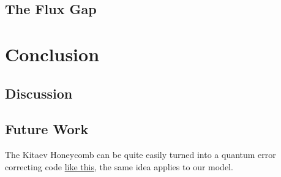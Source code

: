 \hypertarget{the-flux-gap}{%
\subsection{The Flux Gap}\label{the-flux-gap}}

\hypertarget{conclusion}{%
\section{Conclusion}\label{conclusion}}

\hypertarget{discussion}{%
\subsection{Discussion}\label{discussion}}

\hypertarget{future-work}{%
\subsection{Future Work}\label{future-work}}

The Kitaev Honeycomb can be quite easily turned into a quantum error
correcting code \href{https://errorcorrectionzoo.org/c/honeycomb}{like
this}, the same idea applies to our model.

\begin{Shaded}
\begin{Highlighting}[]

\end{Highlighting}
\end{Shaded}
